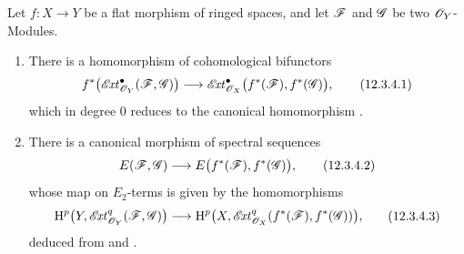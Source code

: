 \begin{proposition}[12.3.4]
\label{0.12.3.4}
Let $f:X\to Y$ be a \textup{flat} morphism of ringed spaces, and let
$\mathscr{F}$ and $\mathscr{G}$ be two $\mathscr{O}_Y$-Modules.
\begin{enumerate}
  \item[\rm(i)] There is a homomorphism of cohomological bifunctors
  \[
    f^*\bigl(\mathscr{E}\!\mathit{xt}^\bullet_{\mathscr{O}_Y}(\mathscr{F},\mathscr{G})\bigr)
    \longrightarrow
    \mathscr{E}\!\mathit{xt}^\bullet_{\mathscr{O}_X}
      \bigl(f^*(\mathscr{F}),f^*(\mathscr{G})\bigr),
    \tag{12.3.4.1}
    \label{0.12.3.4.1}
  \]
  which in degree $0$ reduces to the canonical homomorphism
  .

  \item[\rm(ii)] There is a canonical morphism of spectral sequences
  \[
    E(\mathscr{F},\mathscr{G})
    \longrightarrow E\bigl(f^*(\mathscr{F}),f^*(\mathscr{G})\bigr),
    \tag{12.3.4.2}
    \label{0.12.3.4.2}
  \]
  whose map on $E_2$-terms is given by the homomorphisms
  \[
    \begin{aligned}
    \mathrm{H}^p\bigl(Y,\mathscr{E}\!\mathit{xt}^q_{\mathscr{O}_Y}(\mathscr{F},\mathscr{G})\bigr)
    \longrightarrow
    \mathrm{H}^p\bigl(X,\mathscr{E}\!\mathit{xt}^q_{\mathscr{O}_X}
      (f^*(\mathscr{F}),f^*(\mathscr{G}))\bigr),
    \end{aligned}
    \tag{12.3.4.3}
    \label{0.12.3.4.3}
  \]
  deduced from  and .
\end{enumerate}
\end{proposition}

